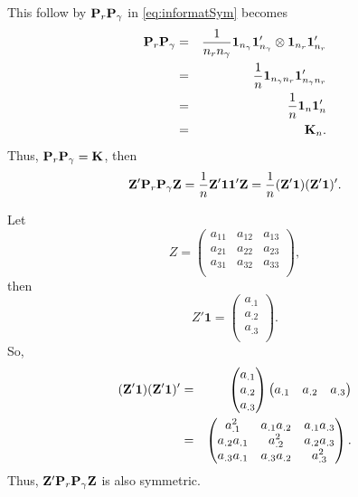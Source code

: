 This follow by $\mathbf{P}_{r}\mathbf{P}_{\gamma}$ in \ref{eq:informatSym} becomes 
\begin{eqnarray}
\nonumber \mathbf{P}_{r}\mathbf{P}_{\gamma}  &=& \frac{1}{n_r n_\gamma}  \mathbf{1}_{n_\gamma}  \mathbf{1}_{n_\gamma}' \otimes \mathbf{1}_{n_r}\mathbf{1}_{n_r}'\\
\nonumber &=& \frac{1}{n}  \mathbf{1}_{n_\gamma n_r}  \mathbf{1}_{n_\gamma n_r}' \\
\nonumber &=& \frac{1}{n}  \mathbf{1}_{n}  \mathbf{1}_{n}' \\
\nonumber &=&	\mathbf{K}_{n}. \\
\end{eqnarray}
Thus,  $\mathbf{P}_{r}\mathbf{P}_{\gamma} = \mathbf{K}$, then
\[ \mathbf{Z}' \mathbf{P}_{r}\mathbf{P}_{\gamma}\mathbf{Z} =  \frac{1}{n} \mathbf{Z}' \mathbf{1} \mathbf{1}' \mathbf{Z}  = \frac{1}{n} (\mathbf{Z}' \mathbf{1}) (\mathbf{Z}' \mathbf{1})'. \] 

Let
\[Z = 
\begin{pmatrix}  
a_{11} & a_{12} & a_{13} \\
a_{21} & a_{22} & a_{23} \\             
a_{31} & a_{32} & a_{33} \\
\end{pmatrix},
\]
then
\[ Z' \mathbf{1} = 
\begin{pmatrix}  
a_{.1} \\
a_{.2}\\             
a_{.3}  \\
\end{pmatrix}.
\]
So, 
\begin{eqnarray}
\nonumber (\mathbf{Z}' \mathbf{1}) (\mathbf{Z}' \mathbf{1})' 
\nonumber &=& \begin{pmatrix}  
a_{.1} \\
a_{.2}\\             
a_{.3}  \\
\end{pmatrix}
 \begin{pmatrix}  
a_{.1} & a_{.2} & a_{.3}\\
\end{pmatrix} \\
\nonumber &=&\begin{pmatrix}  
a_{.1}^2 & a_{.1}a_{.2} & a_{.1}a_{.3} \\
a_{.2}a_{.1} & a_{.2}^2 & a_{.2}a_{.3} \\             
a_{.3}a_{.1} & a_{.3}a_{.2} & a_{.3}^2 \\
\end{pmatrix}. 
\end{eqnarray}
Thus, $\mathbf{Z}' \mathbf{P}_{r}\mathbf{P}_{\gamma}\mathbf{Z}$ is also symmetric.  

